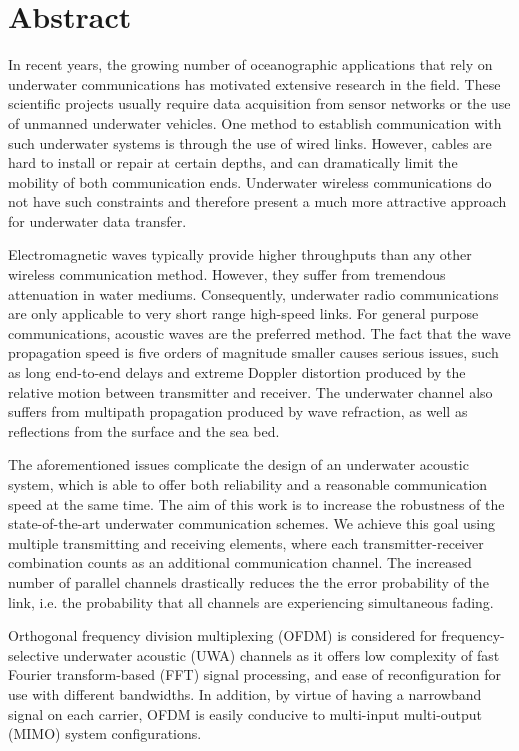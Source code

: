 \chapter*{Abstract}
\thispagestyle{empty}
In recent years, the growing number of oceanographic applications that rely on
underwater communications has motivated extensive research in the field. These scientific projects usually require data acquisition from sensor networks or the use of
unmanned underwater vehicles. One method to establish communication with such underwater
systems is through the use of wired links. However, cables are hard to install or repair at certain
depths, and can dramatically limit the mobility of both communication ends. Underwater wireless
communications do not have such constraints and therefore present a much more attractive approach
for underwater data transfer.

Electromagnetic waves typically provide higher throughputs than any other wireless communication
method. However, they suffer from tremendous attenuation in water mediums.
Consequently, underwater radio communications are only applicable to very short range high-speed
links. For general purpose communications, acoustic waves are the preferred method. The fact that the
wave propagation speed is five orders of magnitude smaller causes serious issues, such as long
end-to-end delays and extreme Doppler distortion produced by the relative motion between
transmitter and receiver. The underwater channel also suffers from multipath propagation
produced by wave refraction, as well as reflections from the surface and the sea bed.

The aforementioned issues complicate the design of an underwater acoustic system, which is able to offer both reliability and a reasonable communication speed at the same time. The aim of this work is to increase the robustness of the state-of-the-art underwater communication schemes. We achieve this goal using multiple transmitting and receiving elements, where each transmitter-receiver combination counts as an additional communication channel. The increased number of parallel channels drastically reduces the the error probability of the link, i.e. the probability that all channels are experiencing simultaneous fading.

Orthogonal frequency division multiplexing (OFDM) is considered for frequency-selective underwater
acoustic (UWA) channels as it offers low complexity of fast Fourier transform-based
(FFT) signal processing, and ease of reconfiguration for use with different bandwidths. In addition,
by virtue of having a narrowband signal on each carrier, OFDM is easily conducive to
multi-input multi-output (MIMO) system configurations.

